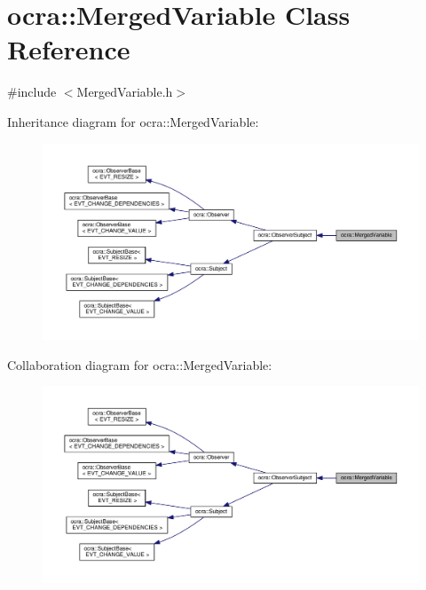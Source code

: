 \hypertarget{classocra_1_1MergedVariable}{}\section{ocra\+:\+:Merged\+Variable Class Reference}
\label{classocra_1_1MergedVariable}


{\ttfamily \#include $<$Merged\+Variable.\+h$>$}



Inheritance diagram for ocra\+:\+:Merged\+Variable\+:
\nopagebreak
\begin{figure}[H]
\begin{center}
\leavevmode
\includegraphics[width=350pt]{d4/da6/classocra_1_1MergedVariable__inherit__graph}
\end{center}
\end{figure}


Collaboration diagram for ocra\+:\+:Merged\+Variable\+:
\nopagebreak
\begin{figure}[H]
\begin{center}
\leavevmode
\includegraphics[width=350pt]{d7/d8b/classocra_1_1MergedVariable__coll__graph}
\end{center}
\end{figure}
